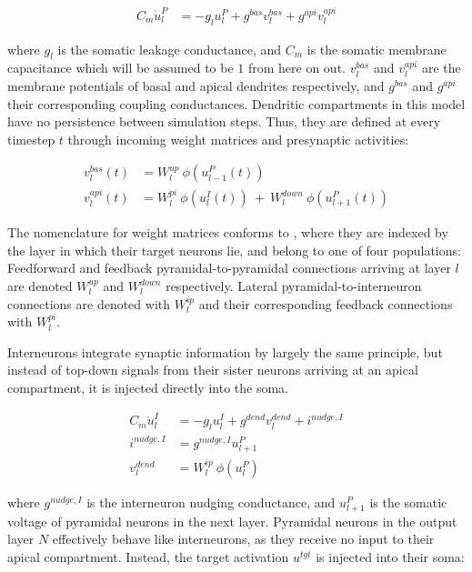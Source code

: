 \begin{align}
  C_m \dot{u}_l^P & = - g_l u_l^{P} + g^{bas} v_l^{bas} + g^{api} v_l^{api} \label{eq-pyr-dynamics-rate}
\end{align}

where $g_l$ is the somatic leakage conductance, and $C_m$ is the somatic membrane capacitance which will be assumed to
be $1$ from here on out. $v_l^{bas}$ and $v_l^{api}$ are the membrane potentials of basal and apical dendrites
respectively, and $g^{bas}$ and $g^{api}$ their corresponding coupling conductances.  Dendritic compartments in this
model have no persistence between simulation steps. Thus, they are defined at every timestep $t$ through incoming weight
matrices and presynaptic activities:

\begin{align}
  v_l^{bas}(t) & = W_l^{up} \ \phi(u_{l-1}^P(t)) \label{eq-v-bas-rate}                                     \\
  v_l^{api}(t) & =  W_l^{pi} \ \phi(u_l^I(t)) \ + \  W_l^{down} \ \phi(u_{l+1}^P(t)) \label{eq-v-api-rate}
\end{align}

The nomenclature for weight matrices conforms to \citep{Haider2021}, where they are indexed by the layer in which their
target neurons lie, and belong to one of four populations: Feedforward and feedback pyramidal-to-pyramidal connections
arriving at layer $l$ are denoted $W_l^{up}$ and $W_l^{down}$ respectively. Lateral pyramidal-to-interneuron connections
are denoted with $W_l^{ip}$ and their corresponding feedback connections with $W_l^{pi}$.
\newline

Interneurons integrate synaptic information by largely the same principle, but instead of top-down signals from their
sister neurons arriving at an apical compartment, it is injected directly into the soma.

\begin{align}
  C_m \dot{u}_l^I & = - g_l u_l^{I} + g^{dend} v_l^{dend} + i^{nudge, I}\label{eq-intn-dynamics} \\
  i^{nudge, I}    & = g^{nudge, I} u_{l+1}^P                                                     \\
  v_l^{dend}      & = W_l^{ip} \ \phi(u_{l}^P)
\end{align}

where $ g^{nudge, I}$ is the interneuron nudging conductance, and $u_{l+1}^P$ is the somatic voltage of pyramidal
neurons in the next layer.  Pyramidal neurons in the output layer $N$ effectively behave like interneurons, as they
receive no input to their apical compartment. Instead, the target  activation $u^{tgt}$ is injected into their soma:

